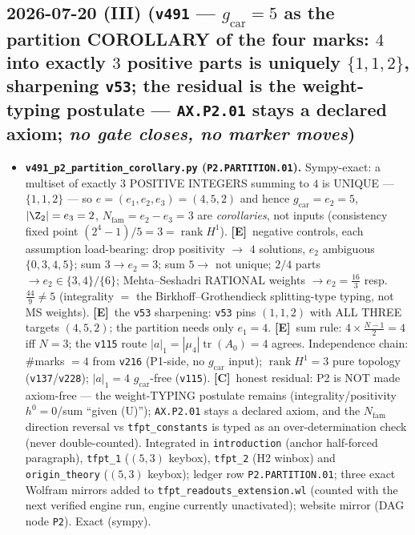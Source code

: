 \documentclass[11pt]{article}
\providecommand{\mE}{\textbf{[E]}}\providecommand{\mC}{\textbf{[C]}}
\providecommand{\gcar}{g_{\mathrm{car}}}\providecommand{\Nfam}{N_{\mathrm{fam}}}
\begin{document}
\subsection*{2026-07-20 (III) (\texttt{v491} --- $\gcar{=}5$ as the partition COROLLARY of the four marks: $4$ into exactly $3$ positive parts is uniquely $\{1,1,2\}$, sharpening \texttt{v53}; the residual is the weight-typing postulate --- \texttt{AX.P2.01} stays a declared axiom; \emph{no gate closes, no marker moves})}
\begin{itemize}[leftmargin=1.5em]
\item \textbf{\texttt{v491\_p2\_partition\_corollary.py} (\texttt{P2.PARTITION.01}).} Sympy-exact: a
multiset of exactly $3$ POSITIVE INTEGERS summing to $4$ is UNIQUE --- $\{1,1,2\}$ --- so
$e=(e_1,e_2,e_3)=(4,5,2)$ and hence $\gcar=e_2=5$, $|\Z_2|=e_3=2$, $\Nfam=e_2{-}e_3=3$ are
\emph{corollaries}, not inputs (consistency fixed point $(2^4{-}1)/5=3=\operatorname{rank}H^1$).
\mE\ negative controls, each assumption load-bearing: drop positivity $\to$ $4$ solutions, $e_2$
ambiguous $\{0,3,4,5\}$; sum $3\to e_2{=}3$; sum $5\to$ not unique; $2/4$ parts $\to e_2\in\{3,4\}/\{6\}$;
Mehta--Seshadri RATIONAL weights $\to e_2=\tfrac{16}3$ resp.\ $\tfrac{44}9\neq5$ (integrality $=$ the
Birkhoff--Grothendieck splitting-type typing, not MS weights). \mE\ the \texttt{v53} sharpening:
\texttt{v53} pins $(1,1,2)$ with ALL THREE targets $(4,5,2)$; the partition needs only $e_1{=}4$.
\mE\ sum rule: $4\times\tfrac{N-1}2=4$ iff $N{=}3$; the \texttt{v115} route
$|a|_1=|\mu_4|\operatorname{tr}(A_0)=4$ agrees. Independence chain: $\#$marks $=4$ from \texttt{v216}
(P1-side, no $\gcar$ input); $\operatorname{rank}H^1=3$ pure topology (\texttt{v137}/\texttt{v228});
$|a|_1=4$ $\gcar$-free (\texttt{v115}). \mC\ honest residual: P2 is NOT made axiom-free --- the
weight-TYPING postulate remains (integrality/positivity $h^0{=}0$/sum ``given (U)'');
\texttt{AX.P2.01} stays a declared axiom, and the $\Nfam$ direction reversal vs
\texttt{tfpt\_constants} is typed as an over-determination check (never double-counted). Integrated in
\texttt{introduction} (anchor half-forced paragraph), \texttt{tfpt\_1} ($(5,3)$ keybox),
\texttt{tfpt\_2} (H2 winbox) and \texttt{origin\_theory} ($(5,3)$ keybox); ledger row
\texttt{P2.PARTITION.01}; three exact Wolfram mirrors added to
\texttt{tfpt\_readouts\_extension.wl} (counted with the next verified engine run, engine currently
unactivated); website mirror (DAG node \texttt{P2}). Exact (sympy).
\end{itemize}
\end{document}
